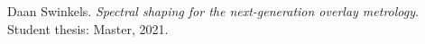 \documentclass[pra,superscriptaddress,reprint]{revtex4-1}
\begin{document}
\begin{thebibliography}{99}

Daan Swinkels.
\textit{Spectral shaping for the next-generation overlay metrology}.
Student thesis: Master, 2021.








\end{thebibliography}
\end{document}
